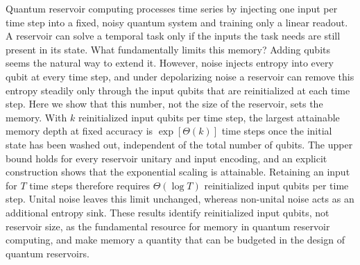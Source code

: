 Quantum reservoir computing processes time series by injecting one input per time step into a fixed, noisy quantum system and training only a linear readout. A reservoir can solve a temporal task only if the inputs the task needs are still present in its state. What fundamentally limits this memory? Adding qubits seems the natural way to extend it. However, noise injects entropy into every qubit at every time step, and under depolarizing noise a reservoir can remove this entropy steadily only through the input qubits that are reinitialized at each time step. Here we show that this number, not the size of the reservoir, sets the memory. With $k$ reinitialized input qubits per time step, the largest attainable memory depth at fixed accuracy is $\exp[\Theta(k)]$ time steps once the initial state has been washed out, independent of the total number of qubits. The upper bound holds for every reservoir unitary and input encoding, and an explicit construction shows that the exponential scaling is attainable. Retaining an input for $T$ time steps therefore requires $\Theta(\log T)$ reinitialized input qubits per time step. Unital noise leaves this limit unchanged, whereas non-unital noise acts as an additional entropy sink. These results identify reinitialized input qubits, not reservoir size, as the fundamental resource for memory in quantum reservoir computing, and make memory a quantity that can be budgeted in the design of quantum reservoirs.
